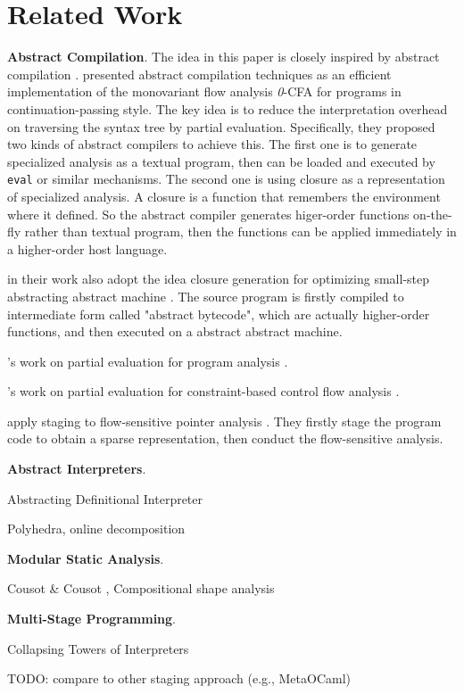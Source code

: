 \section{Related Work}

\textbf{Abstract Compilation}. The idea in this paper is closely inspired by 
abstract compilation \cite{Boucher:1996:ACN:647473.727587}.
\citeauthor{Boucher:1996:ACN:647473.727587} presented abstract compilation
techniques as an efficient implementation of the monovariant flow analysis 
\textit{0}-CFA for programs in continuation-passing style. The key idea is to 
reduce the interpretation overhead on traversing the syntax tree by partial evaluation.
Specifically, they proposed two kinds of abstract compilers to achieve this. 
The first one is to generate specialized analysis as a textual program, then 
can be loaded and executed by \texttt{eval} or similar mechanisms. The second 
one is using closure as a representation of specialized analysis. 
A closure is a function that remembers the environment where it defined. So the 
abstract compiler generates higer-order functions on-the-fly rather than textual 
program, then the functions can be applied immediately in a higher-order host language.

\citeauthor{Johnson:2013:OAA:2500365.2500604} in their work also adopt the 
idea closure generation for optimizing small-step abstracting abstract machine
\cite{Johnson:2013:OAA:2500365.2500604}. The source program is firstly compiled
to intermediate form called "abstract bytecode", which are actually higher-order functions, 
and then executed on a abstract abstract machine.

\citeauthor{damian1999partial}'s work on partial evaluation for program analysis \cite{damian1999partial}.

\citeauthor{amtoft1999partial}'s work on partial evaluation for constraint-based 
control flow analysis \cite{amtoft1999partial}.

\citeauthor{hardekopf2011flow} apply staging to flow-sensitive pointer analysis \cite{hardekopf2011flow}. 
They firstly stage the program code to obtain a sparse representation, then conduct
the flow-sensitive analysis. 

\textbf{Abstract Interpreters}. 

Abstracting Definitional Interpreter \cite{darais2017abstracting}

Polyhedra, online decomposition

\textbf{Modular Static Analysis}. 

Cousot \& Cousot \cite{DBLP:conf/cc/CousotC02}, 
Compositional shape analysis \cite{DBLP:conf/popl/CalcagnoDOY09}

\textbf{Multi-Stage Programming}.

Collapsing Towers of Interpreters\cite{Amin:2017:CTI:3177123.3158140}

TODO: compare to other staging approach (e.g., MetaOCaml)
